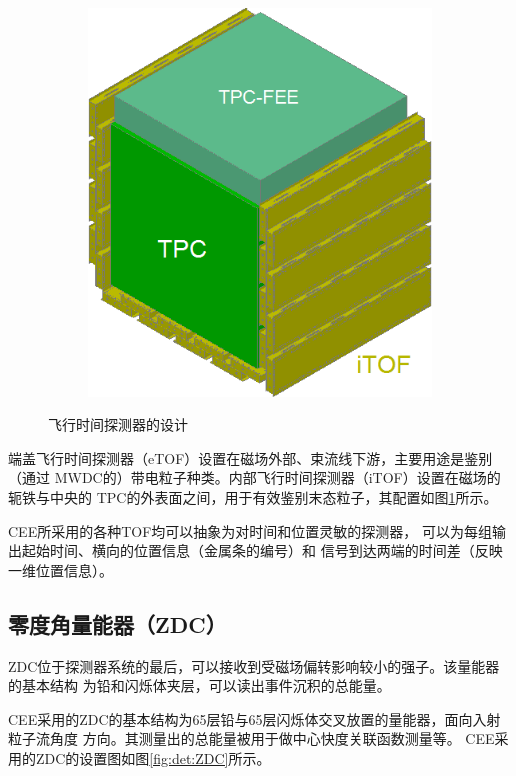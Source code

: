 \documentclass[bachelor,openany,oneside,color]{buaathesis}
\begin{document}
\begin{figure}
\begin{subfigure}{0.5\textwidth}
		\includegraphics[width=\textwidth]{./resource/CEE-iTOF.png}
		\label{fig:det:TOF:iTOF}
	\end{subfigure}
	\caption{飞行时间探测器的设计\cite{Lyu:ConceptDesign}}
	\label{fig:det:TOF}
\end{figure}

端盖飞行时间探测器（eTOF）设置在磁场外部、束流线下游，主要用途是鉴别（通过
MWDC的）带电粒子种类。内部飞行时间探测器（iTOF）设置在磁场的轭铁与中央的
TPC的外表面之间，用于有效鉴别末态粒子，其配置如图\ref{fig:det:TOF:iTOF}所示。

CEE所采用的各种TOF均可以抽象为对时间和位置灵敏的探测器，
可以为每组输出起始时间、横向的位置信息（金属条的编号）和
信号到达两端的时间差（反映一维位置信息）。

\subsection{零度角量能器（ZDC）}

ZDC位于探测器系统的最后，可以接收到受磁场偏转影响较小的强子。该量能器的基本结构
为铅和闪烁体夹层，可以读出事件沉积的总能量。

CEE采用的ZDC的基本结构为65层铅与65层闪烁体交叉放置的量能器，面向入射粒子流角度
方向。其测量出的总能量被用于做中心快度关联函数测量等。\cite{Lyu:ConceptDesign}
CEE采用的ZDC的设置图如图\ref{fig:det:ZDC}所示。
\end{document}
